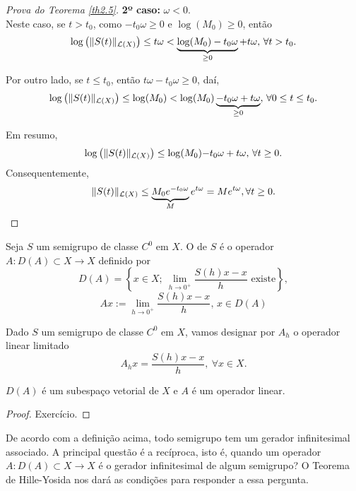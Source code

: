 \begin{proof}[Prova do Teorema \ref{th2.5}]
\noindent\textbf{2º caso:} $\omega< 0$.\\
Neste caso, se $t>t_0$, como $-t_0\omega\geq 0$ e $\log(M_0)\geq 0$, então
\begin{equation*}
\log\left(\|S(t)\|_{\mathcal{L}(X)}\right)\leq t\omega<\underbrace{\log(M_0)-t_0\omega}_{\geq 0}+t\omega, \, \forall t>t_0. 
\end{equation*}

Por outro lado, se $t\leq t_0$, então $t\omega-t_0\omega\geq 0$, daí,
\begin{equation*}
\log\left(\|S(t)\|_{\mathcal{L}(X)}\right)\leq \log(M_0)<\log(M_0)\underbrace{-t_0\omega+t\omega}_{\geq 0}, \, \forall 0\leq t\leq t_0. 
\end{equation*}

Em resumo,
\begin{equation*}
\log\left(\|S(t)\|_{\mathcal{L}(X)}\right)\leq \log(M_0){-t_0\omega+t\omega}, \, \forall t\geq 0. 
\end{equation*}
Consequentemente,
\begin{equation*}
    \|S(t)\|_{\mathcal{L}(X)}\leq \underbrace{M_0e^{-t_0\omega}}_{M}e^{t\omega}=Me^{t\omega}, \forall t\geq 0.
\end{equation*}
\end{proof}

\begin{definition}
    Seja $S$ um semigrupo de classe $C^0$ em $X$. O  de $S$ é o operador $A:D(A)\subset X\longrightarrow X$ definido por 
\[D(A)=\left\{x\in X;\ \lim\limits_{h\to 0^+} \frac{S(h)x-x}{h} \text{ existe}\right\},\]
\[Ax:=\lim\limits_{h\to 0^+} \frac{S(h)x-x}{h},\, x\in D(A)\]
\end{definition}

Dado $S$ um semigrupo de classe $C^0$ em $X$, vamos designar por $A_h$ o operador linear limitado 
    \[A_hx=\frac{S(h)x-x}{h},\ \forall x\in X.\]

\begin{proposition}\label{DAsubspace}
     $D(A)$ é um subespaço vetorial de $X$ e $A$ é um operador linear.
\end{proposition}
\begin{proof}
    Exercício.
\end{proof}


\begin{remark}
De acordo com a definição acima, todo semigrupo tem um gerador infinitesimal associado. A principal questão é a recíproca, isto é, {\color{blue} quando um operador $A:D(A)\subset X\longrightarrow X$ é o gerador infinitesimal de algum semigrupo?} O Teorema de Hille-Yosida nos dará as condições para responder a essa pergunta.
\end{remark}


